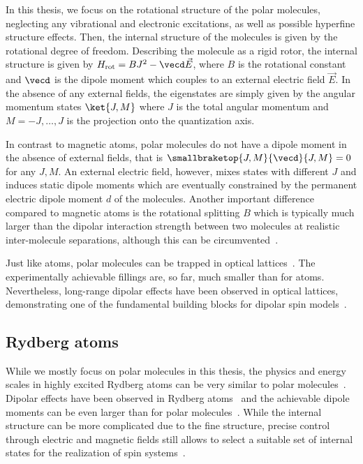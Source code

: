 In this thesis, we focus on the rotational structure of the polar molecules,
neglecting any vibrational and electronic excitations, as well as possible hyperfine structure
effects. Then, the internal structure of the molecules is given by the rotational degree
of freedom. Describing the molecule as a rigid rotor, the internal structure is given by
$H_\text{rot}=B J^2 - \vecd \vec{E}$, where $B$ is the rotational constant and $\vecd$ is the
dipole moment which couples to an external electric field $\vec{E}$. In the absence of any external
fields, the eigenstates are simply given by the angular momentum states $\ket{J,M}$ where $J$ is
the total angular momentum and $M=-J, \dots, J$ is the projection onto the quantization axis.

In contrast to magnetic atoms, polar molecules do not have a dipole moment in the absence of
external fields, that is $\smallbraketop{J,M}{\vecd}{J,M}=0$ for any $J, M$. An external electric
field, however, mixes states with different $J$ and induces static dipole moments which are
eventually constrained by the permanent electric dipole moment $d$ of the molecules. Another important
difference compared to magnetic atoms is the rotational splitting $B$ which is typically much
larger than the dipolar interaction strength between two molecules at realistic
inter-molecule separations, although this can be circumvented~\cite{Klinsmann2014}.

Just like atoms, polar molecules can be trapped in optical lattices~\cite{Chotia2012}. The
experimentally achievable fillings are, so far, much smaller than for atoms. Nevertheless,
long-range dipolar effects have been observed in optical lattices, demonstrating one of the
fundamental building blocks for dipolar spin models~\cite{Yan2013}.

\subsection{Rydberg atoms}

While we mostly focus on polar molecules in this thesis, the physics and energy scales in highly
excited Rydberg atoms can be very similar to polar molecules~\cite{Low2012}. Dipolar effects have
been observed in Rydberg atoms~\cite{Westermann2006,Nipper2012b,Barredo2014,Ravets2015} and the
achievable dipole moments can be even larger than for polar molecules~\cite{Booth2014}. While
the internal structure can be more complicated due to the fine structure, precise control through
electric and magnetic fields still allows to select a suitable set of internal states for the
realization of spin systems~\cite{Barredo2014,Weber2015}.

